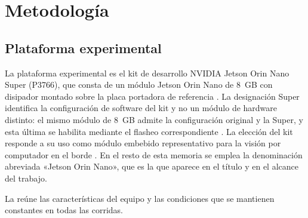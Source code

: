 %

\chapter{Metodología}
\label{chap:methodology}

\section{Plataforma experimental}
\label{sec:platform}

La plataforma experimental es el kit de desarrollo NVIDIA Jetson Orin Nano
Super (P3766), que consta de un módulo Jetson Orin Nano de 8~GB con
disipador montado sobre la placa portadora de referencia
\cite{nvidiacorporation2024}. La designación Super identifica la
configuración de software del kit y no un módulo de hardware distinto: el
mismo módulo de 8~GB admite la configuración original y la Super, y esta
última se habilita mediante el flasheo correspondiente
\cite{nvidiacorporation2024}. La elección del kit responde a su uso como
módulo embebido representativo para la visión por computador en el borde
\cite{scalcon2024, alqahtani2026}. En el resto de esta memoria se emplea la
denominación abreviada «Jetson Orin Nano», que es la que aparece en el
título y en el alcance del trabajo.

La  reúne las características del equipo y
las condiciones que se mantienen constantes en todas las corridas.

